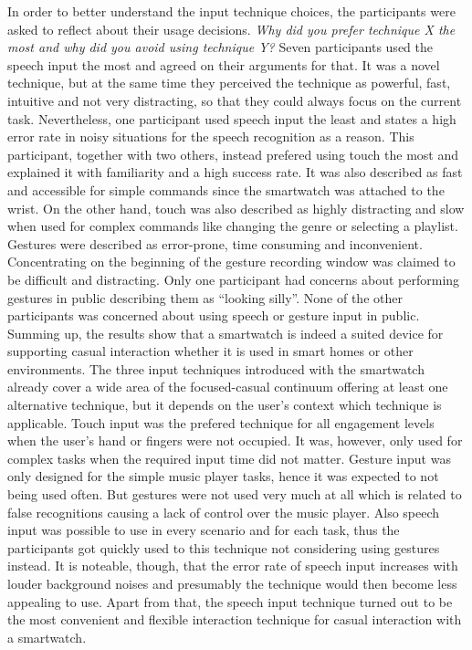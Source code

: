 In order to better understand the input technique choices, the participants were asked to reflect about their usage decisions. \textit{Why did you prefer technique X the most and why did you avoid using technique Y?} Seven participants used the speech input the most and agreed on their arguments for that. It was a novel technique, but at the same time they perceived the technique as powerful, fast, intuitive and not very distracting, so that they could always focus on the current task. Nevertheless, one participant used speech input the least and states a high error rate in noisy situations for the speech recognition as a reason. This participant, together with two others, instead prefered using touch the most and explained it with familiarity and a high success rate. It was also described as fast and accessible for simple commands since the smartwatch was attached to the wrist. On the other hand, touch was also described as highly distracting and slow when used for complex commands like changing the genre or selecting a playlist. Gestures were described as error-prone, time consuming and inconvenient. Concentrating on the beginning of the gesture recording window was claimed to be difficult and distracting. Only one participant had concerns about performing gestures in public describing them as ``looking silly''. None of the other participants was concerned about using speech or gesture input in public. \\

Summing up, the results show that a smartwatch is indeed a suited device for supporting casual interaction whether it is used in smart homes or other environments. The three input techniques introduced with the smartwatch already cover a wide area of the focused-casual continuum offering at least one alternative technique, but it depends on the user's context which technique is applicable. Touch input was the prefered technique for all engagement levels when the user's hand or fingers were not occupied. It was, however, only used for complex tasks when the required input time did not matter.
Gesture input was only designed for the simple music player tasks, hence it was expected to not being used often. But gestures were not used very much at all which is related to false recognitions causing a lack of control over the music player. Also speech input was possible to use in every scenario and for each task, thus the participants got quickly used to this technique not considering using gestures instead. It is noteable, though, that the error rate of speech input increases with louder background noises and presumably the technique would then become less appealing to use. Apart from that, the speech input technique turned out to be the most convenient and flexible interaction technique for casual interaction with a smartwatch.


